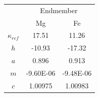 \begin{table}[]
\begin{tabular}{c|cc}
 & \multicolumn{2}{c}{Endmember}    \\
 & Mg           & Fe           \\ \hline
$\kappa_{ref}$ & 17.51      & 11.26      \\
$h$ & -10.93     & -17.32     \\
$a$ & 0.896     & 0.913     \\
$m$ & -9.60E-06 & -9.48E-06 \\
$c$ & 1.00975    & 1.00983   
\end{tabular}
\end{table}




















\pagebreak


